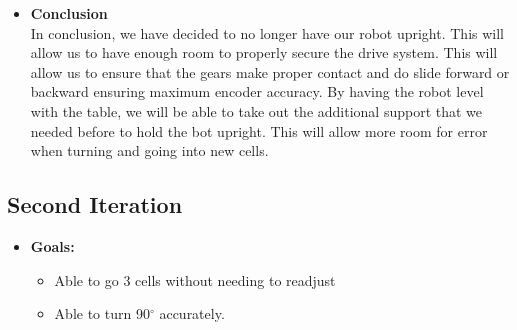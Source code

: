 \documentclass[11pt]{article}
\begin{document}
\begin{itemize}
\begin{itemize}
	\end{itemize}
\item \textbf{Conclusion}\\
In conclusion, we have decided to no longer have our robot upright. This will allow us to have enough room to properly secure the drive system. This will allow us to ensure that the gears make proper contact and do slide forward or backward ensuring maximum encoder accuracy. By having the robot level with the table, we will be able to take out the additional support that we needed before to hold the bot upright. This will allow more room for error when turning and going into new cells.
\end{itemize}
\newpage

\subsection{Second Iteration}
\begin{itemize}
\item \textbf{Goals:}
	\begin{itemize}
	\item Able to go 3 cells without needing to readjust
	\item Able to turn 90$^{\circ}$ accurately.
	\end{itemize}
\end{itemize}
\end{document}
